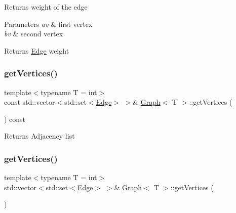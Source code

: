 Returns weight of the edge 
\begin{DoxyParams}{Parameters}
{\em av} & first vertex \\
\hline
{\em bv} & second vertex \\
\hline
\end{DoxyParams}
\begin{DoxyReturn}{Returns}
\hyperlink{struct_graph_1_1_edge}{Edge} weight 
\end{DoxyReturn}
\mbox{\label{class_graph_ab37935cf08ce2cafd2edac3a503010f4}} 
\subsubsection{\texorpdfstring{get\+Vertices()}{getVertices()}\hspace{0.1cm}{\footnotesize\ttfamily [1/2]}}
{\footnotesize\ttfamily template$<$typename T = int$>$ \\
const std\+::vector$<$std\+::set$<$\hyperlink{struct_graph_1_1_edge}{Edge}$>$ $>$\& \hyperlink{class_graph}{Graph}$<$ T $>$\+::get\+Vertices (\begin{DoxyParamCaption}{ }\end{DoxyParamCaption}) const\hspace{0.3cm}{\ttfamily [inline]}}

\begin{DoxyReturn}{Returns}
Adjacency list 
\end{DoxyReturn}
\mbox{\label{class_graph_ab7c3b45b65d2b72ced442ff01c81da60}} 
\subsubsection{\texorpdfstring{get\+Vertices()}{getVertices()}\hspace{0.1cm}{\footnotesize\ttfamily [2/2]}}
{\footnotesize\ttfamily template$<$typename T = int$>$ \\
std\+::vector$<$std\+::set$<$\hyperlink{struct_graph_1_1_edge}{Edge}$>$ $>$\& \hyperlink{class_graph}{Graph}$<$ T $>$\+::get\+Vertices (\begin{DoxyParamCaption}{ }\end{DoxyParamCaption})\hspace{0.3cm}{\ttfamily [inline]}}

